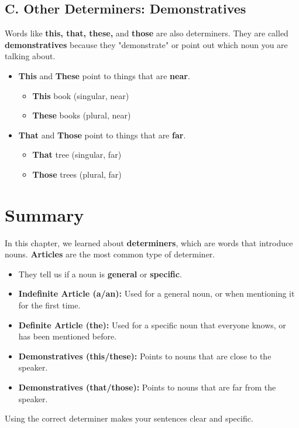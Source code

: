 \subsection*{C. Other Determiners: Demonstratives}
Words like \textbf{this, that, these,} and \textbf{those} are also determiners. They are called \textbf{demonstratives} because they "demonstrate" or point out which noun you are talking about.
\begin{itemize}
    \item \textbf{This} and \textbf{These} point to things that are \textbf{near}.
    \begin{itemize}
        \item \textbf{This} book (singular, near)
        \item \textbf{These} books (plural, near)
    \end{itemize}
    \item \textbf{That} and \textbf{Those} point to things that are \textbf{far}.
    \begin{itemize}
        \item \textbf{That} tree (singular, far)
        \item \textbf{Those} trees (plural, far)
    \end{itemize}
\end{itemize}

\section{Summary}
\begin{summarybox}
In this chapter, we learned about \textbf{determiners}, which are words that introduce nouns. \textbf{Articles} are the most common type of determiner.
\begin{itemize}
    \item They tell us if a noun is \textbf{general} or \textbf{specific}.
    \item \textbf{Indefinite Article (a/an):} Used for a general noun, or when mentioning it for the first time.
    \item \textbf{Definite Article (the):} Used for a specific noun that everyone knows, or has been mentioned before.
    \item \textbf{Demonstratives (this/these):} Points to nouns that are close to the speaker.
    \item \textbf{Demonstratives (that/those):} Points to nouns that are far from the speaker.
\end{itemize}
Using the correct determiner makes your sentences clear and specific.
\end{summarybox}
